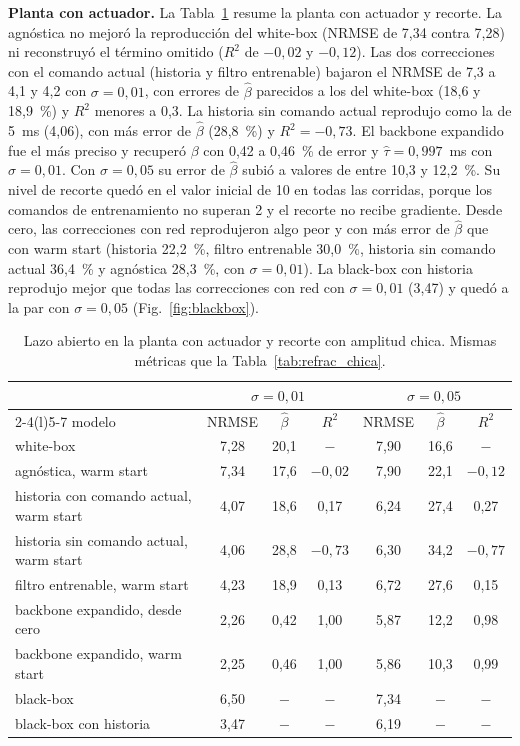 \documentclass[11pt,a4paper]{article}
\newcommand{\bh}{\hat\beta}
\begin{document}
\textbf{Planta con actuador.} La Tabla~\ref{tab:act_chica} resume la planta con actuador y recorte. La agnóstica no mejoró la reproducción del white-box (NRMSE de 7,34 contra 7,28) ni reconstruyó el término omitido ($R^2$ de $-0{,}02$ y $-0{,}12$). Las dos correcciones con el comando actual (historia y filtro entrenable) bajaron el NRMSE de 7,3 a 4,1 y 4,2 con $\sigma = 0{,}01$, con errores de $\bh$ parecidos a los del white-box (18,6 y 18,9~\%) y $R^2$ menores a 0,3. La historia sin comando actual reprodujo como la de 5~ms (4,06), con más error de $\bh$ (28,8~\%) y $R^2 = -0{,}73$. El backbone expandido fue el más preciso y recuperó $\beta$ con 0,42 a 0,46~\% de error y $\hat\tau = 0{,}997$~ms con $\sigma = 0{,}01$. Con $\sigma = 0{,}05$ su error de $\bh$ subió a valores de entre 10,3 y 12,2~\%. Su nivel de recorte quedó en el valor inicial de 10 en todas las corridas, porque los comandos de entrenamiento no superan 2 y el recorte no recibe gradiente. Desde cero, las correcciones con red reprodujeron algo peor y con más error de $\bh$ que con warm start (historia 22,2~\%, filtro entrenable 30,0~\%, historia sin comando actual 36,4~\% y agnóstica 28,3~\%, con $\sigma = 0{,}01$). La black-box con historia reprodujo mejor que todas las correcciones con red con $\sigma = 0{,}01$ (3,47) y quedó a la par con $\sigma = 0{,}05$ (Fig.~\ref{fig:blackbox}).

\begin{table}[H]
\centering
\small
\caption{Lazo abierto en la planta con actuador y recorte con amplitud chica. Mismas métricas que la Tabla~\ref{tab:refrac_chica}.}
\label{tab:act_chica}
\begin{tabular}{@{}lcccccc@{}}
\toprule
& \multicolumn{3}{c}{$\sigma = 0{,}01$} & \multicolumn{3}{c}{$\sigma = 0{,}05$} \\
\cmidrule(lr){2-4}\cmidrule(l){5-7}
modelo & NRMSE & $\bh$ & $R^2$ & NRMSE & $\bh$ & $R^2$ \\
\midrule
white-box & 7,28 & 20,1 & $-$ & 7,90 & 16,6 & $-$ \\
agnóstica, warm start & 7,34 & 17,6 & $-0{,}02$ & 7,90 & 22,1 & $-0{,}12$ \\
historia con comando actual, warm start & 4,07 & 18,6 & 0,17 & 6,24 & 27,4 & 0,27 \\
historia sin comando actual, warm start & 4,06 & 28,8 & $-0{,}73$ & 6,30 & 34,2 & $-0{,}77$ \\
filtro entrenable, warm start & 4,23 & 18,9 & 0,13 & 6,72 & 27,6 & 0,15 \\
backbone expandido, desde cero & 2,26 & 0,42 & 1,00 & 5,87 & 12,2 & 0,98 \\
backbone expandido, warm start & 2,25 & 0,46 & 1,00 & 5,86 & 10,3 & 0,99 \\
black-box & 6,50 & $-$ & $-$ & 7,34 & $-$ & $-$ \\
black-box con historia & 3,47 & $-$ & $-$ & 6,19 & $-$ & $-$ \\
\bottomrule
\end{tabular}
\end{table}
\end{document}
